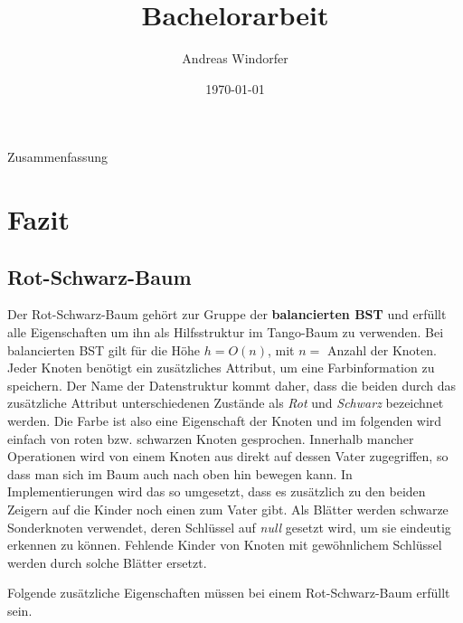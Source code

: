 \documentclass[a4paper,12pt]{article}
\title{Bachelorarbeit}
\author{

	Andreas Windorfer\\
}
\date{\today}
\begin{document}
\maketitle
\newpage
Zusammenfassung
\newpage
\tableofcontents


\newpage

\section{Fazit}

\subsection{Rot-Schwarz-Baum}
Der Rot-Schwarz-Baum gehört zur Gruppe der \textbf{balancierten BST} und erfüllt alle Eigenschaften um ihn als Hilfsstruktur im Tango-Baum zu verwenden. Bei balancierten BST gilt für die Höhe $h = \mathit{O(n)}$, mit $n =$ Anzahl der Knoten. Jeder Knoten benötigt ein zusätzliches Attribut, um eine Farbinformation zu speichern. Der Name der Datenstruktur kommt daher, dass die beiden durch das zusätzliche Attribut unterschiedenen Zustände als \textit{Rot} und \textit{Schwarz} bezeichnet werden. Die Farbe ist also eine Eigenschaft der Knoten und im folgenden wird einfach von roten bzw. schwarzen Knoten gesprochen. Innerhalb mancher Operationen wird von einem Knoten aus direkt auf dessen Vater zugegriffen, so dass man sich im Baum auch nach oben hin bewegen kann. In Implementierungen wird das so umgesetzt, dass es zusätzlich zu den beiden Zeigern auf die Kinder noch einen zum Vater gibt. Als Blätter werden schwarze Sonderknoten verwendet, deren Schlüssel auf \textit{null} gesetzt wird, um sie eindeutig erkennen zu können. Fehlende Kinder von Knoten mit gewöhnlichem Schlüssel werden durch solche Blätter ersetzt.  

\noindent Folgende zusätzliche Eigenschaften müssen bei einem Rot-Schwarz-Baum erfüllt sein. 
\end{document}
